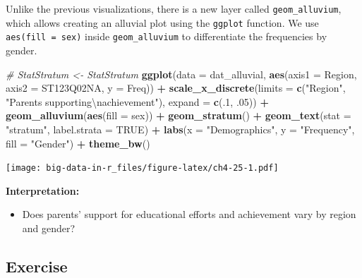 \documentclass[]{book}
\newenvironment{Shaded}{\begin{snugshade}}{\end{snugshade}}
\newcommand{\CharTok}[1]{\textcolor[rgb]{0.31,0.60,0.02}{#1}}
\newcommand{\CommentTok}[1]{\textcolor[rgb]{0.56,0.35,0.01}{\textit{#1}}}
\newcommand{\DataTypeTok}[1]{\textcolor[rgb]{0.13,0.29,0.53}{#1}}
\newcommand{\DecValTok}[1]{\textcolor[rgb]{0.00,0.00,0.81}{#1}}
\newcommand{\FloatTok}[1]{\textcolor[rgb]{0.00,0.00,0.81}{#1}}
\newcommand{\KeywordTok}[1]{\textcolor[rgb]{0.13,0.29,0.53}{\textbf{#1}}}
\newcommand{\NormalTok}[1]{#1}
\newcommand{\OperatorTok}[1]{\textcolor[rgb]{0.81,0.36,0.00}{\textbf{#1}}}
\newcommand{\OtherTok}[1]{\textcolor[rgb]{0.56,0.35,0.01}{#1}}
\newcommand{\StringTok}[1]{\textcolor[rgb]{0.31,0.60,0.02}{#1}}
\providecommand{\tightlist}{%
  \setlength{\itemsep}{0pt}\setlength{\parskip}{0pt}}
\begin{document}
Unlike the previous visualizations, there is a new layer called \texttt{geom\_alluvium}, which allows creating an alluvial plot using the \texttt{ggplot} function. We use \texttt{aes(fill\ =\ sex)} inside \texttt{geom\_alluvium} to differentiate the frequencies by gender.

\begin{Shaded}
\begin{Highlighting}[]
\CommentTok{# StatStratum <- StatStratum}
\KeywordTok{ggplot}\NormalTok{(}\DataTypeTok{data =}\NormalTok{ dat_alluvial,}
       \KeywordTok{aes}\NormalTok{(}\DataTypeTok{axis1 =}\NormalTok{ Region, }\DataTypeTok{axis2 =}\NormalTok{ ST123Q02NA, }\DataTypeTok{y =}\NormalTok{ Freq)) }\OperatorTok{+}
\StringTok{  }\KeywordTok{scale_x_discrete}\NormalTok{(}\DataTypeTok{limits =} \KeywordTok{c}\NormalTok{(}\StringTok{"Region"}\NormalTok{, }\StringTok{"Parents supporting}\CharTok{\textbackslash{}n}\StringTok{achievement"}\NormalTok{),}
                   \DataTypeTok{expand =} \KeywordTok{c}\NormalTok{(.}\DecValTok{1}\NormalTok{, }\FloatTok{.05}\NormalTok{)) }\OperatorTok{+}
\StringTok{  }\KeywordTok{geom_alluvium}\NormalTok{(}\KeywordTok{aes}\NormalTok{(}\DataTypeTok{fill =}\NormalTok{ sex)) }\OperatorTok{+}
\StringTok{  }\KeywordTok{geom_stratum}\NormalTok{() }\OperatorTok{+}
\StringTok{  }\KeywordTok{geom_text}\NormalTok{(}\DataTypeTok{stat =} \StringTok{"stratum"}\NormalTok{, }\DataTypeTok{label.strata =} \OtherTok{TRUE}\NormalTok{) }\OperatorTok{+}
\StringTok{  }\KeywordTok{labs}\NormalTok{(}\DataTypeTok{x =} \StringTok{"Demographics"}\NormalTok{, }\DataTypeTok{y =} \StringTok{"Frequency"}\NormalTok{, }\DataTypeTok{fill =} \StringTok{"Gender"}\NormalTok{) }\OperatorTok{+}
\StringTok{  }\KeywordTok{theme_bw}\NormalTok{()}
\end{Highlighting}
\end{Shaded}

\texttt{[image: big-data-in-r\_files/figure-latex/ch4-25-1.pdf]}

\textbf{Interpretation:}

\begin{itemize}
\tightlist
\item
  Does parents' support for educational efforts and achievement vary by region and gender?
\end{itemize}

\hypertarget{exercise-2}{%
\subsection{Exercise}\label{exercise-2}}
\end{document}
